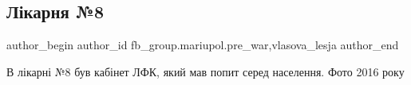  
 
 
 
 

\subsection{Лікарня №8}
\label{sec:10_02_2023.fb.fb_group.mariupol.pre_war.4.l_karnya__8}
 
\ifcmt
 author_begin
   author_id fb_group.mariupol.pre_war,vlasova_lesja
 author_end
\fi

В лікарні №8 був кабінет ЛФК, який мав попит серед населення.
Фото 2016 року

